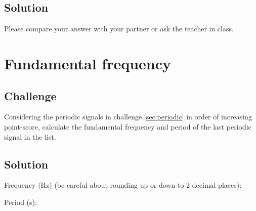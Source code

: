 \subsection*{Solution}
Please compare your answer with your partner or ask the teacher in class.




\newpage
\section{Fundamental frequency}

\subsection*{Challenge}
Considering the periodic signals in challenge \ref{sec:periodic} in order of increasing point-score, calculate the fundamental frequency and period of the last periodic signal in the list.

\subsection*{Solution}
Frequency (Hz) (be careful about rounding up or down to 2 decimal places):\\

Period (s):\\
